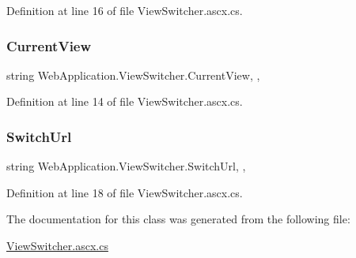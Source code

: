 Definition at line 16 of file View\+Switcher.\+ascx.\+cs.

\mbox{\label{classWebApplication_1_1ViewSwitcher_a65a2e1bbc4abb8488ed59abc6904f47a}} 
\subsubsection{\texorpdfstring{CurrentView}{CurrentView}}
{\footnotesize\ttfamily string Web\+Application.\+View\+Switcher.\+Current\+View\hspace{0.3cm}{\ttfamily [get]}, {}, {\ttfamily [protected]}}



Definition at line 14 of file View\+Switcher.\+ascx.\+cs.

\mbox{\label{classWebApplication_1_1ViewSwitcher_aa6e83ed2a4b0c20c680600d42d3aed05}} 
\subsubsection{\texorpdfstring{SwitchUrl}{SwitchUrl}}
{\footnotesize\ttfamily string Web\+Application.\+View\+Switcher.\+Switch\+Url\hspace{0.3cm}{\ttfamily [get]}, {}, {\ttfamily [protected]}}



Definition at line 18 of file View\+Switcher.\+ascx.\+cs.



The documentation for this class was generated from the following file\+:\begin{DoxyCompactItemize}
\item 
\mbox{\hyperlink{ViewSwitcher_8ascx_8cs}{View\+Switcher.\+ascx.\+cs}}\end{DoxyCompactItemize}
